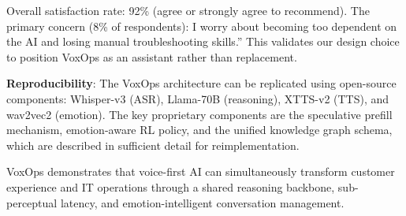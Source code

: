 \documentclass[conference,10pt]{IEEEtran}
\begin{document}
Overall satisfaction rate: 92\% (agree or strongly agree to recommend). The primary concern (8\% of respondents): I worry about becoming too dependent on the AI and losing manual troubleshooting skills.'' This validates our design choice to position VoxOps as an assistant rather than replacement.

\textbf{Reproducibility}: The VoxOps architecture can be replicated using open-source components: Whisper-v3 (ASR), Llama-70B (reasoning), XTTS-v2 (TTS), and wav2vec2 (emotion). The key proprietary components are the speculative prefill mechanism, emotion-aware RL policy, and the unified knowledge graph schema, which are described in sufficient detail for reimplementation.

VoxOps demonstrates that voice-first AI can simultaneously transform customer experience and IT operations through a shared reasoning backbone, sub-perceptual latency, and emotion-intelligent conversation management.



\end{document}
